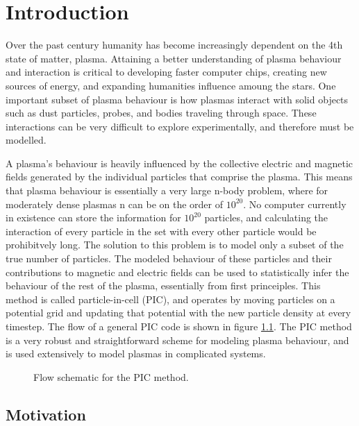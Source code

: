 
\chapter{Introduction}
	Over the past century humanity has become increasingly dependent on the 4th state of matter, plasma. Attaining a better understanding of plasma behaviour and interaction is critical to developing faster computer chips, creating new sources of energy, and expanding humanities influence amoung the stars. One important subset of plasma behaviour is how plasmas interact with solid objects such as dust particles, probes, and bodies traveling through space. These interactions can be very difficult to explore experimentally, and therefore must be modelled. 
	
A plasma's behaviour is heavily influenced by the collective electric and magnetic fields generated by the individual particles that comprise the plasma. This means that plasma behaviour is essentially a very large n-body problem, where for moderately dense plasmas n can be on the order of $10^{20}$. No computer currently in existence can store the information for $10^{20}$ particles, and calculating the interaction of every particle in the set with every other particle would be prohibitvely long. The solution to this problem is to model only a subset of the true number of particles. The modeled behaviour of these particles and their contributions to magnetic and electric fields can be used to statistically infer the behaviour of the rest of the plasma, essentially from first princeiples. This method is called particle-in-cell (PIC), and operates by moving particles on a potential grid and updating that potential with the new particle density at every timestep. The flow of a general PIC code is shown in figure \ref{fig:pic_flowchart}. The PIC method is a very robust and straightforward scheme for modeling plasma behaviour, and is used extensively to model plasmas in complicated systems.

\begin{figure}
\begin{center}

\end{center}
\caption{Flow schematic for the PIC method.}
\label{fig:pic_flowchart}
\end{figure}


	\section{Motivation}

